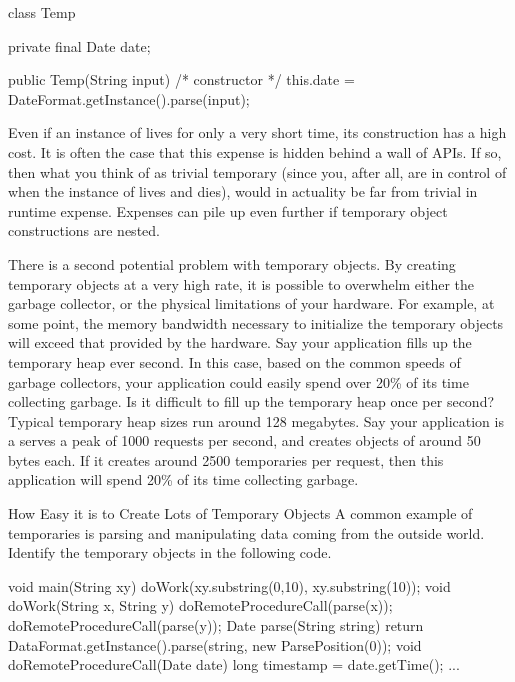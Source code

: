 \begin{shortlisting}
class Temp {
	private final Date date;
	
	public Temp(String input) { /* constructor */
		this.date = DateFormat.getInstance().parse(input);
	}
}
\end{shortlisting}

Even if an instance of  lives for only a very short time, its
construction has a high cost. It is often the case that this expense is hidden
behind a wall of APIs. If so, then what you think of as trivial temporary (since
you, after all, are in control of when the instance of  lives and
dies), would in actuality be far from trivial in runtime expense. Expenses can
pile up even further if temporary object constructions are nested.

There is a second potential problem with temporary objects. By creating temporary
objects at a very high rate, it is possible to overwhelm either the garbage
collector, or the physical limitations of your hardware. For example, at some
point, the memory bandwidth necessary to initialize the temporary objects will
exceed that provided by the hardware. Say your application fills up the temporary
heap ever second. In this case, based on the common speeds of garbage collectors,
your application could easily
 spend over 20\% of its time collecting garbage. Is it difficult to fill up the
 temporary heap once per second? Typical temporary heap sizes run around 128
 megabytes. Say your application is a serves a peak of 1000 requests per second,
 and creates objects of around 50 bytes each. If it creates around 2500
 temporaries per request, then this application will spend 20\% of its time
 collecting garbage.



\begin{example}{How Easy it is to Create Lots of Temporary Objects}
A common example of temporaries is parsing
and manipulating data coming from the outside world. Identify the temporary
objects in the following code.

\begin{shortlisting}%
void main(String xy) {
	doWork(xy.substring(0,10), xy.substring(10));
}	
void doWork(String x, String y) {
	doRemoteProcedureCall(parse(x));
	doRemoteProcedureCall(parse(y));
}
Date parse(String string) {
	return DataFormat.getInstance().parse(string, new ParsePosition(0));
}
void doRemoteProcedureCall(Date date) {
	long timestamp = date.getTime();
	...
}
\end{shortlisting}
\end{example} 

